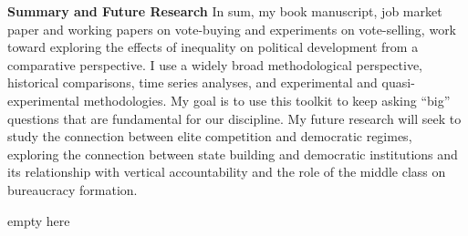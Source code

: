 \documentclass[11pt]{letter} %
\begin{document}
\begin{letter}{}
{\bf Summary and Future Research} In sum, my book manuscript, job market paper and working papers on vote-buying and experiments on vote-selling, work toward exploring the effects of inequality on political development from a comparative perspective. I use a widely broad methodological perspective, historical comparisons, time series analyses, and experimental and quasi-experimental methodologies. My goal is to use this toolkit to keep asking ``big'' questions that are fundamental for our discipline. My future research will seek to study the connection between elite competition and democratic regimes, exploring the connection between state building and democratic institutions and its relationship with vertical accountability and the role of the middle class on bureaucracy formation.

\closing{{\color{white}empty here}}




\end{letter}
\end{document}
